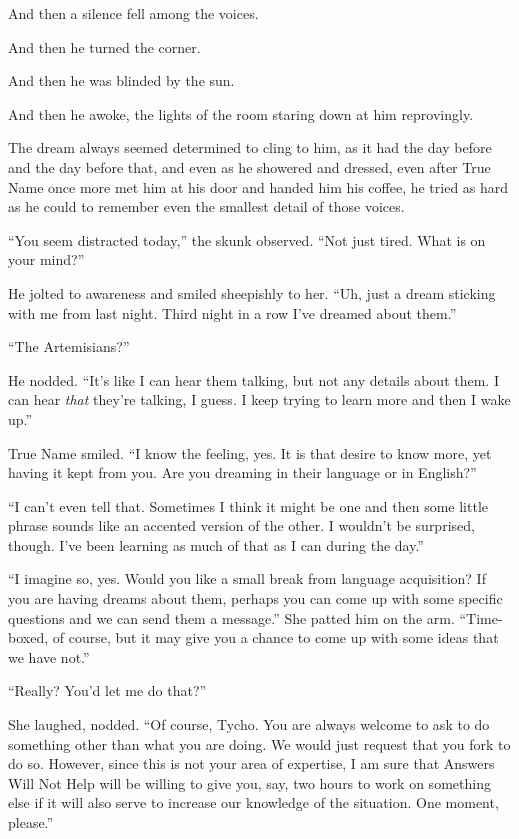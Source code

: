 And then a silence fell among the voices.

And then he turned the corner.

And then he was blinded by the sun.

And then he awoke, the lights of the room staring down at him reprovingly.

The dream always seemed determined to cling to him, as it had the day before and the day before that, and even as he showered and dressed, even after True Name once more met him at his door and handed him his coffee, he tried as hard as he could to remember even the smallest detail of those voices.

``You seem distracted today,'' the skunk observed. ``Not just tired. What is on your mind?''

He jolted to awareness and smiled sheepishly to her. ``Uh, just a dream sticking with me from last night. Third night in a row I've dreamed about them.''

``The Artemisians?''

He nodded. ``It's like I can hear them talking, but not any details about them. I can hear \emph{that} they're talking, I guess. I keep trying to learn more and then I wake up.''

True Name smiled. ``I know the feeling, yes. It is that desire to know more, yet having it kept from you. Are you dreaming in their language or in English?''

``I can't even tell that. Sometimes I think it might be one and then some little phrase sounds like an accented version of the other. I wouldn't be surprised, though. I've been learning as much of that as I can during the day.''

``I imagine so, yes. Would you like a small break from language acquisition? If you are having dreams about them, perhaps you can come up with some specific questions and we can send them a message.'' She patted him on the arm. ``Time-boxed, of course, but it may give you a chance to come up with some ideas that we have not.''

``Really? You'd let me do that?''

She laughed, nodded. ``Of course, Tycho. You are always welcome to ask to do something other than what you are doing. We would just request that you fork to do so. However, since this is not your area of expertise, I am sure that Answers Will Not Help will be willing to give you, say, two hours to work on something else if it will also serve to increase our knowledge of the situation. One moment, please.''

